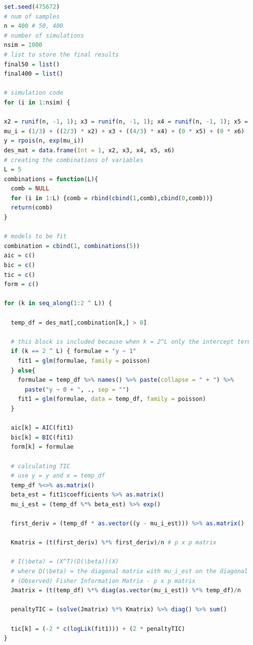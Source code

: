 \documentclass[paper=a4, fontsize=11pt]{scrartcl} %
\numberwithin{equation}{section} %
\begin{document}
\begin{lstlisting}[language = R, frame = single]
set.seed(475672)
# num of samples
n = 400 # 50, 400
# number of simulations
nsim = 1000
# list to store the final results
final50 = list()
final400 = list()

# simulation code
for (i in 1:nsim) {

x2 = runif(n, -1, 1); x3 = runif(n, -1, 1); x4 = runif(n, -1, 1); x5 = runif(n, -1, 1); x6 = runif(n, -1, 1)
mu_i = (1/3) + ((2/3) * x2) + x3 + ((4/3) * x4) + (0 * x5) + (0 * x6)
y = rpois(n, exp(mu_i))
des_mat = data.frame(Int = 1, x2, x3, x4, x5, x6)
# creating the combinations of variables
L = 5
combinations = function(L){
  comb = NULL
  for (i in 1:L) {comb = rbind(cbind(1,comb),cbind(0,comb))}
  return(comb)
}

# models to be fit
combination = cbind(1, combinations(5))
aic = c()
bic = c()
tic = c()
form = c()

for (k in seq_along(1:2 ^ L)) {
  
  temp_df = des_mat[,combination[k,] > 0]
  
  # this block is included because when k = 2^L only the intercept term is in the model in which case temp_df returns a vector and not a data frame so we can fit this manually for the last iteration; stupid edge cases
  if (k == 2 ^ L) { formulae = "y ~ 1"
    fit1 = glm(formulae, family = poisson)
  } else{ 
  	formulae = temp_df %>% names() %>% paste(collapse = " + ") %>%
      paste("y ~ 0 + ", ., sep = "")
    fit1 = glm(formulae, data = temp_df, family = poisson)
  }
  
  aic[k] = AIC(fit1)
  bic[k] = BIC(fit1)
  form[k] = formulae
  
  # calculating TIC
  # use y = y and x = temp_df
  temp_df %<>% as.matrix()
  beta_est = fit1$coefficients %>% as.matrix()
  mu_i_est = (temp_df %*% beta_est) %>% exp()
  
  first_deriv = (temp_df * as.vector((y - mu_i_est))) %>% as.matrix()
   
  Kmatrix = (t(first_deriv) %*% first_deriv)/n # p x p matrix
  
  # I(\beta) = (X^T)(D(\beta))(X)
  # where D(\beta) = the diagonal matrix with mu_i_est on the diagonal elements
  # (Observed) Fisher Information Matrix - p x p matrix
  Jmatrix = (t(temp_df) %*% diag(as.vector(mu_i_est)) %*% temp_df)/n 
  
  penaltyTIC = (solve(Jmatrix) %*% Kmatrix) %>% diag() %>% sum()
  
  tic[k] = (-2 * c(logLik(fit1))) + (2 * penaltyTIC)  
}


\end{lstlisting}
\end{document}
